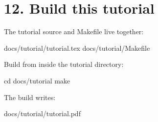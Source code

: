 \documentclass[11pt,a4paper]{article}
\begin{document}
\section*{12. Build this tutorial}

The tutorial source and Makefile live together:

\begin{outputbox}
docs/tutorial/tutorial.tex
docs/tutorial/Makefile
\end{outputbox}

Build from inside the tutorial directory:

\begin{commandbox}
cd docs/tutorial
make
\end{commandbox}

The build writes:

\begin{outputbox}
docs/tutorial/tutorial.pdf
\end{outputbox}
\end{document}
